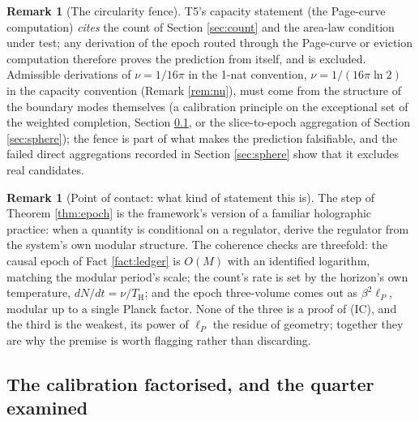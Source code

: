 \documentclass[11pt]{article}
\theoremstyle{definition}
\newtheorem{remark}[theorem]{Remark}
\renewcommand{\TH}{T_{\mathrm{H}}} %
\newcommand{\lP}{\ell_{P}}
\begin{document}
\begin{remark}[The circularity fence]\label{rem:fence}
T5's capacity statement (the Page-curve computation) \emph{cites} the count of Section \ref{sec:count} and the area-law condition under test; any derivation of the epoch routed through the Page-curve or eviction computation therefore proves the prediction from itself, and is excluded. Admissible derivations of $\nu = 1/16\pi$ in the 1-nat convention, $\nu = 1/(16\pi\ln 2)$ in the capacity convention (Remark \ref{rem:nu}), must come from the structure of the boundary modes themselves (a calibration principle on the exceptional set of the weighted completion, Section \ref{subsec:calibration}, or the slice-to-epoch aggregation of Section \ref{sec:sphere}); the fence is part of what makes the prediction falsifiable, and the failed direct aggregations recorded in Section \ref{sec:sphere} show that it excludes real candidates.
\end{remark}

\begin{remark}[Point of contact: what kind of statement this is]\label{rem:epochtouch}
The step of Theorem \ref{thm:epoch} is the framework's version of a familiar holographic practice: when a quantity is conditional on a regulator, derive the regulator from the system's own modular structure. The coherence checks are threefold: the causal epoch of Fact \ref{fact:ledger} is $O(M)$ with an identified logarithm, matching the modular period's scale; the count's rate is set by the horizon's own temperature, $dN/dt = \nu/\TH$; and the epoch three-volume comes out as $\beta^2\lP$, modular up to a single Planck factor. None of the three is a proof of (IC), and the third is the weakest, its power of $\lP$ the residue of geometry; together they are why the premise is worth flagging rather than discarding.
\end{remark}


\subsection{The calibration factorised, and the quarter examined}\label{subsec:calibration}
\end{document}
